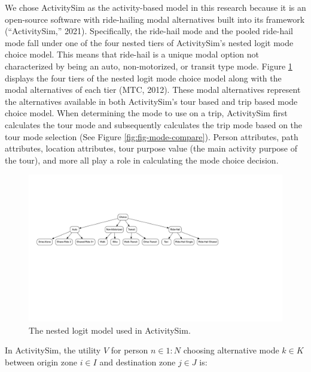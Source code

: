 \documentclass[fancy, masters]{byuthesis}
\begin{document}
We chose ActivitySim as the activity-based model in this research because it is an open-source software with ride-hailing modal alternatives built into its framework ({``ActivitySim,''} 2021). Specifically, the ride-hail mode and the pooled ride-hail mode fall under one of the four nested tiers of ActivitySim's nested logit mode choice model. This means that ride-hail is a unique modal option not characterized by being an auto, non-motorized, or transit type mode. Figure \ref{fig:fig-asim-nest} displays the four tiers of the nested logit mode choice model along with the modal alternatives of each tier (MTC, 2012). These modal alternatives represent the alternatives available in both ActivitySim's tour based and trip based mode choice model. When determining the mode to use on a trip, ActivitySim first calculates the tour mode and subsequently calculates the trip mode based on the tour mode selection (See Figure \ref{fig:fig-mode-compare}). Person attributes, path attributes, location attributes, tour purpose value (the main activity purpose of the tour), and more all play a role in calculating the mode choice decision.

\begin{figure}

{\centering \includegraphics[width=1.8\linewidth,trim = {3cm 6.5cm 4.5cm 6cm}]{thesis_files/figure-latex/fig-asim-nest-1} 

}

\caption{The nested logit model used in ActivitySim.}\label{fig:fig-asim-nest}
\end{figure}

In ActivitySim, the utility \(V\) for person \(n \in {1:N}\) choosing alternative mode \(k \in K\) between origin zone \(i \in I\) and destination zone \(j \in J\) is:
\end{document}
